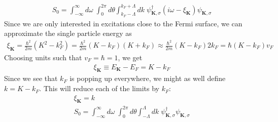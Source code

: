 \documentclass[14pt]{extarticle}
\begin{document}
\begin{equation}\begin{aligned}
	S_0 = \int_{-\infty}^\infty d\omega\;\int_0^{2\pi} d\theta \int_{k_F - \Lambda}^{k_F + \Lambda}  dk\; \psi_{\mathbf{K},\sigma}^\dagger \left(i\omega - \xi_{\mathbf{K}}\right)\psi_{\mathbf{K},\sigma}
\end{aligned}\end{equation}
Since we are only interested in excitations close to the Fermi surface, we can approximate the single particle energy as
\begin{equation}\begin{aligned}
	\xi_\mathbf{K} = \frac{\hbar^2}{2m}\left(K^2 - k_F^2\right) = \frac{\hbar^2}{2m}\left(K - k_F\right)\left(K + k_F\right) \approx \frac{\hbar^2}{2m}\left(K - k_F\right)2k_F = \hbar \left(K-k_F\right)v_F
\end{aligned}\end{equation}
Choosing units such that \(v_F = \hbar = 1\), we get
\begin{equation}\begin{aligned}
	\xi_\mathbf{K} \equiv E_\mathbf{K} - E_F = K - k_F
\end{aligned}\end{equation}
Since we see that \(k_F\) is popping up everywhere, we might as well define \(k = K - k_F\). This will reduce each of the limits by \(k_F\):
\begin{gather}
	\xi_\mathbf{K} = k \\
	S_0 = \int_{-\infty}^\infty d\omega\;\int_0^{2\pi} d\theta \int_{- \Lambda}^{\Lambda}  dk\; \psi_{\mathbf{K},\sigma}^\dagger \psi_{\mathbf{K},\sigma}\label{action}
\end{gather}
\end{document}
